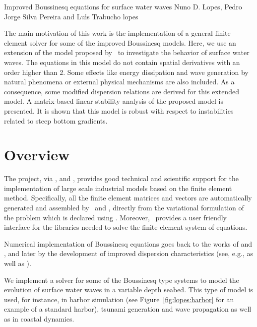               {Improved Boussinesq equations for surface water waves}
              {Nuno D. Lopes, Pedro Jorge Silva Pereira and Lu{\'\i}s Trabucho}
              {lopes}

The main motivation of this work is the implementation of a
general finite element solver for some of the improved Boussinesq
models. Here, we use an extension of the model
proposed by~\citet{ZhaoTengCheng2004} to investigate the behavior
of surface water waves. The equations in this model do not contain
spatial derivatives with an order higher than 2. Some effects like
energy dissipation and wave generation by natural phenomena or external
physical mechanisms are also included.  As a consequence, some modified
dispersion relations are derived for this extended model. A matrix-based
linear stability analysis of the proposed model is presented.  It is
shown that this model is robust with respect to instabilities related
to steep bottom gradients.

\section{Overview}

The \fenics project, via \dolfin, \ufl and \ffc, provides good technical
and scientific support for the implementation of large scale industrial
models based on the finite element method. Specifically, all the finite
element matrices and vectors are automatically generated and assembled
by \dolfin\ and \ffc, directly from the variational formulation of the
problem which is declared using \ufl. Moreover, \dolfin\ provides a user
friendly interface for the libraries needed to solve the finite element
system of equations.

Numerical implementation of Boussinesq equations goes back to
the works of \citet{Peregrine1967} and \citet{Wu1981}, and later
by the development of improved dispersion characteristics (see,
e.g., \citet{MadsenEtAl1991,Nwogu1993,ChenLiu1994} as well as
\citet{BejiNadaoka1996}).

We implement a solver for some of the Boussinesq type systems to model the
evolution of surface water waves in a variable depth
seabed.  This type of model is used, for instance, in harbor simulation
(see Figure~\ref{fig:lopes:harbor} for an example of a standard harbor),
tsunami generation and wave propagation as well as in coastal dynamics.

